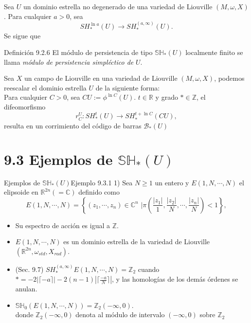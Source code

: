 \documentclass{beamer}
\begin{document}
\begin{frame}
Sea $U$ un dominio estrella no degenerado de una variedad de Liouville $(M,\omega, X)$. Para cualquier $a>0$, sea $$SH_{\ast}^{\ln a}(U)\rightarrow SH_{\ast}^{(a,\infty)}(U).$$
Se sigue que

\begin{block}{Definici\'on 9.2.6}
El m\'odulo de persistencia de tipo $\mathbb{SH}_{\ast}(U)$ localmente finito se llama \emph{m\'odulo de persistencia simpl\'ectico de} $U$.
\end{block}
\end{frame}

\begin{frame}
Sea $X$ un campo de Liouville en una variedad de Liouville $(M,\omega,X)$, podemos reescalar el dominio estrella $U$ de la siguiente forma:\\
$\,$\\
Para cualquier $C>0$, sea $CU:=\phi^{\ln C}(U)$. $t\in \mathbb{R}$ y grado $\ast\in \mathbb{Z}$, el difeomorfismo
$$r_{C}^{U}:SH_{\ast}^{t}(U)\rightarrow SH_{\ast}^{t+\ln C}(CU),$$
resulta en un corrimiento del c\'odigo de barras $\mathcal{B}_{\ast}(U)$
\end{frame}

\section{9.3 Ejemplos de $\mathbb{SH}_{\ast}(U)$}

\begin{frame}{Ejemplos de $\mathbb{SH}_{\ast}(U)$}{Ejemplo 9.3.1}
1) Sea $N\geq 1$  un entero y $E(1,N,\cdots,N)$ el elipsoide en $\mathbb{R}^{2n}(=\mathbb{C})$ definido como
$$E(1,N,\cdots,N)=\left\{ (z_1,\cdots,z_n)\in \mathbb{C}^n\,\,| \pi(\frac{|z_1|}{1},\frac{|z_2|}{N},\cdots,\frac{|z_n|}{N})<1\right\},$$

\begin{itemize}
\item Su espectro de acci\'on es igual a $\mathbb{Z}$.
\item $E(1,N,\cdots,N)$ es un dominio estrella de la variedad de Liouville $(\mathbb{R}^{2n},\omega_{std},X_{rad})$.
\item (Sec. 9.7) $SH_{\ast}^{(a,\infty)} E(1,N,\cdots,N)=\mathbb{Z}_2$ cuando $\ast=-2|\lceil -a\rceil |-2(n-1)|\lceil \frac{-a}{N}\rceil|$, y las homolog\'ias de los dem\'as \'ordenes se anulan.
\item $\mathbb{SH}_0(E(1,N,\cdots,N))=\mathbb{Z}_2(-\infty,0)$.\\
donde $\mathbb{Z}_2(-\infty,0)$ denota al m\'odulo de intervalo $(-\infty,0)$ sobre $\mathbb{Z}_2$
\end{itemize}
\end{frame}
\end{document}
